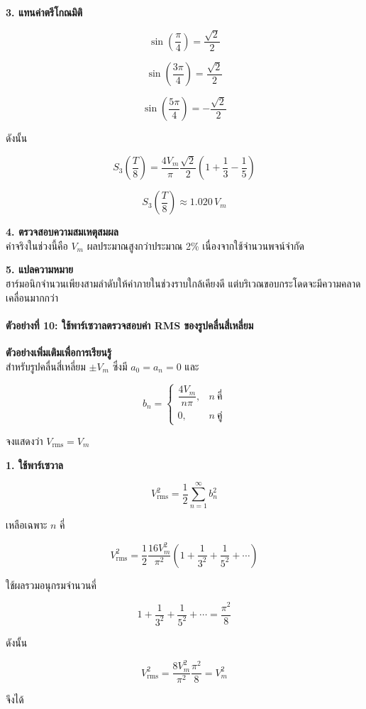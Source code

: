 \textbf{3. แทนค่าตรีโกณมิติ}

\[
\sin\left(\frac{\pi}{4}\right)=\frac{\sqrt{2}}{2}
\]

\[
\sin\left(\frac{3\pi}{4}\right)=\frac{\sqrt{2}}{2}
\]

\[
\sin\left(\frac{5\pi}{4}\right)=-\frac{\sqrt{2}}{2}
\]

ดังนั้น

\[
S_3\left(\frac{T}{8}\right)
=\frac{4V_m}{\pi}\frac{\sqrt{2}}{2}
\left(1+\frac{1}{3}-\frac{1}{5}\right)
\]

\[
S_3\left(\frac{T}{8}\right)
\approx1.020\,V_m
\]

\textbf{4. ตรวจสอบความสมเหตุสมผล}\\
ค่าจริงในช่วงนี้คือ \(V_m\) ผลประมาณสูงกว่าประมาณ 2\% เนื่องจากใช้จำนวนพจน์จำกัด

\textbf{5. แปลความหมาย}\\
ฮาร์มอนิกจำนวนเพียงสามลำดับให้ค่าภายในช่วงราบใกล้เคียงดี แต่บริเวณขอบกระโดดจะมีความคลาดเคลื่อนมากกว่า

\paragraph{ตัวอย่างที่ 10: ใช้พาร์เซวาลตรวจสอบค่า RMS ของรูปคลื่นสี่เหลี่ยม}

\textbf{ตัวอย่างเพิ่มเติมเพื่อการเรียนรู้}\\
สำหรับรูปคลื่นสี่เหลี่ยม \(\pm V_m\) ซึ่งมี \(a_0=a_n=0\) และ

\[
b_n=
\begin{cases}
\dfrac{4V_m}{n\pi}, & n\ \text{คี่}\\
0, & n\ \text{คู่}
\end{cases}
\]

จงแสดงว่า \(V_{\mathrm{rms}}=V_m\)

\textbf{1. ใช้พาร์เซวาล}

\[
V_{\mathrm{rms}}^2
=\frac{1}{2}\sum_{n=1}^{\infty}b_n^2
\]

เหลือเฉพาะ \(n\) คี่

\[
V_{\mathrm{rms}}^2
=\frac{1}{2}\frac{16V_m^2}{\pi^2}
\left(1+\frac{1}{3^2}+\frac{1}{5^2}+\cdots\right)
\]

ใช้ผลรวมอนุกรมจำนวนคี่

\[
1+\frac{1}{3^2}+\frac{1}{5^2}+\cdots=\frac{\pi^2}{8}
\]

ดังนั้น

\[
V_{\mathrm{rms}}^2
=\frac{8V_m^2}{\pi^2}\frac{\pi^2}{8}
=V_m^2
\]

จึงได้

